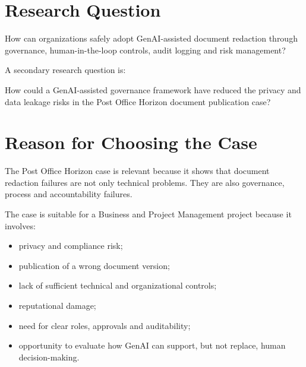 \documentclass[12pt,a4paper]{article}
\begin{document}
\section{Research Question}

\begin{quotebox}
How can organizations safely adopt GenAI-assisted document redaction through governance, human-in-the-loop controls, audit logging and risk management?
\end{quotebox}

\medskip

A secondary research question is:

\begin{quotebox}
How could a GenAI-assisted governance framework have reduced the privacy and data leakage risks in the Post Office Horizon document publication case?
\end{quotebox}

\section{Reason for Choosing the Case}

The Post Office Horizon case is relevant because it shows that document redaction failures are not only technical problems. They are also governance, process and accountability failures.

The case is suitable for a Business and Project Management project because it involves:

\begin{itemize}
    \item privacy and compliance risk;
    \item publication of a wrong document version;
    \item lack of sufficient technical and organizational controls;
    \item reputational damage;
    \item need for clear roles, approvals and auditability;
    \item opportunity to evaluate how GenAI can support, but not replace, human decision-making.
\end{itemize}

\end{document}
